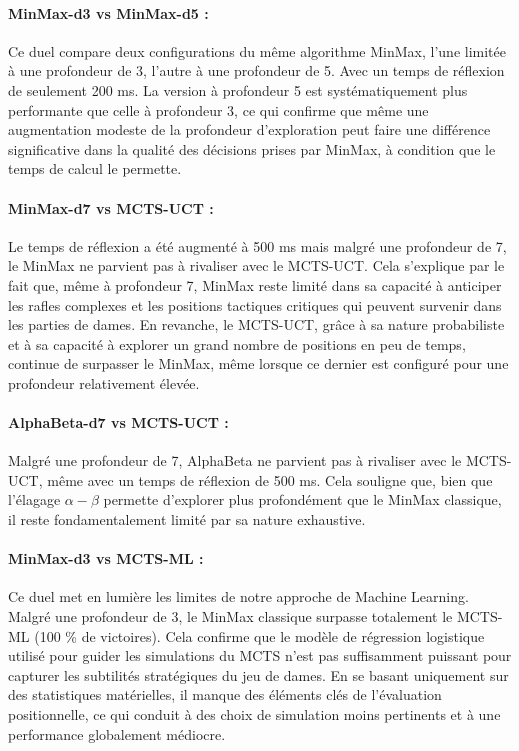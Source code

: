 \documentclass[a4paper]{article}
\begin{document}
\paragraph{MinMax-d3 vs MinMax-d5 :}
Ce duel compare deux configurations du même algorithme MinMax, l'une limitée à une profondeur de 3, l'autre à une profondeur de 5. 
Avec un temps de réflexion de seulement 200 ms. La version à profondeur 5 est systématiquement plus performante que celle à profondeur 3,
 ce qui confirme que même une augmentation modeste de la profondeur d'exploration peut faire une différence significative dans la qualité 
 des décisions prises par MinMax, à condition que le temps de calcul le permette.

\paragraph{MinMax-d7 vs MCTS-UCT :}
Le temps de réflexion a été augmenté à 500 ms mais malgré une profondeur de 7, le MinMax ne parvient pas à rivaliser avec le MCTS-UCT. 
Cela s'explique par le fait que, même à profondeur 7, 
MinMax reste limité dans sa capacité à anticiper les rafles complexes et les positions tactiques critiques qui peuvent survenir dans les 
parties de dames. En revanche, le MCTS-UCT, grâce à sa nature probabiliste et à sa capacité à explorer un grand nombre de positions en
 peu de temps, continue de surpasser le MinMax, même lorsque ce dernier est configuré pour une profondeur relativement élevée.

\paragraph{AlphaBeta-d7 vs MCTS-UCT :}
Malgré une profondeur de 7, AlphaBeta ne parvient pas à rivaliser avec le MCTS-UCT, même avec un temps de réflexion de 500 ms. Cela souligne que,
bien que l'élagage $\alpha-\beta$ permette d'explorer plus profondément que le MinMax classique, il reste fondamentalement limité par sa 
nature exhaustive. 

\paragraph{MinMax-d3 vs MCTS-ML :}
Ce duel met en lumière les limites de notre approche de Machine Learning. Malgré une profondeur de 3, le MinMax classique surpasse totalement 
le MCTS-ML (100 \% de victoires). Cela confirme que le modèle de régression logistique utilisé pour guider les simulations du MCTS n'est pas
 suffisamment puissant pour capturer les subtilités stratégiques du jeu de dames. En se basant uniquement sur des statistiques matérielles, 
 il manque des éléments clés de l'évaluation positionnelle, ce qui conduit à des choix de simulation moins pertinents et à une performance 
 globalement médiocre.
\end{document}
